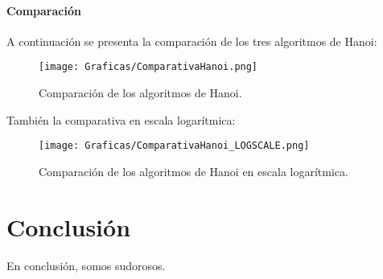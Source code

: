 \documentclass[a4paper,12pt]{article} %
\begin{document}
\paragraph{Comparación}

A continuación se presenta la comparación de los tres algoritmos de Hanoi:

\begin{figure}[H]
	\centering
	\texttt{[image: Graficas/ComparativaHanoi.png]}
	\caption{Comparación de los algoritmos de Hanoi.}
\end{figure}

También la comparativa en escala logarítmica:

\begin{figure}[H]
	\centering
	\texttt{[image: Graficas/ComparativaHanoi\_LOGSCALE.png]}
	\caption{Comparación de los algoritmos de Hanoi en escala logarítmica.}
\end{figure}

\section{Conclusión}
En conclusión, somos sudorosos.
\end{document}

